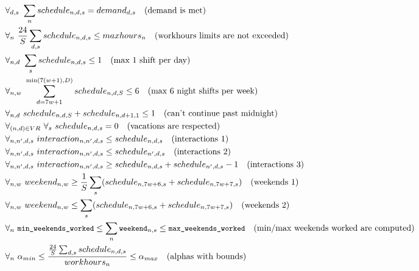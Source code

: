 \documentclass{article}
\newcommand{\varWeekendWorkedIndicator}[2]{\texttt{\small weekend}_{#1, #2}}
\newcommand{\varMinWeekendsWorked}{\texttt{\small min\_weekends\_worked}}
\newcommand{\varMaxWeekendsWorked}{\texttt{\small max\_weekends\_worked}}
\begin{document}
\begin{align*}
&\forall_{d,s}\ \sum_n schedule_{n,d,s} = demand_{d, s}\quad \text{(demand is met)} \\
&\forall_{n}\ \frac{24}S \sum_{d, s} schedule_{n,d,s} \leq maxhours_n \quad \text{(workhours limits are not exceeded)} \\
&\forall_{n,d}\ \sum_s schedule_{n,d,s} \leq 1\quad \text{(max 1 shift per day)} \\
&\forall_{n,w}\ \sum_{d=7w+1}^{\min(7(w+1), D)} schedule_{n,d,S} \leq 6\quad \text{(max 6 night shifts per week)} \\
&\forall_{n,d}\ schedule_{n,d,S}+schedule_{n,d+1,1} \leq 1\quad \text{(can't continue past midnight)} \\
&\forall_{(n,d)\in VR}\ \forall_s\ schedule_{n,d,s} = 0\quad \text{(vacations are respected)} \\
&\forall_{n,n',d,s}\ interaction_{n,n',d,s} \leq schedule_{n,d,s}\quad \text{(interactions 1)} \\
&\forall_{n,n',d,s}\ interaction_{n,n',d,s} \leq schedule_{n',d,s}\quad \text{(interactions 2)} \\
&\forall_{n,n',d,s}\ interaction_{n,n',d,s} \geq schedule_{n,d,s}+schedule_{n',d,s}-1\quad \text{(interactions 3)} \\
&\forall_{n, w}\ weekend_{n, w} \geq \frac{1}{S}\sum_s (schedule_{n, 7w+6, s} + schedule_{n, 7w+7, s}) \quad \text{(weekends 1)} \\
&\forall_{n, w}\ weekend_{n, w} \leq \sum_s (schedule_{n, 7w+6, s} + schedule_{n, 7w+7, s}) \quad \text{(weekends 2)} \\
&\forall_{n}\ \varMinWeekendsWorked \le \sum_n \varWeekendWorkedIndicator{n}{s} \le \varMaxWeekendsWorked \quad \text{(min/max weekends worked are computed)} \\
&\forall_{n}\ \alpha_{min} \leq \frac{\frac{24}{S}\sum_{d,s}schedule_{n,d,s}}{workhours_n} \leq \alpha_{max}\quad \text{(alphas with bounds)}
\end{align*}
\end{document}
